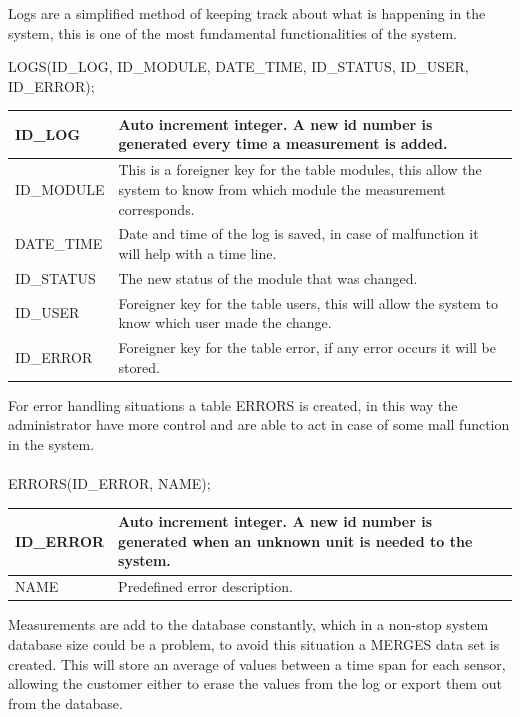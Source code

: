 Logs are a simplified method of keeping track about what is happening in the system, this is one of the most fundamental functionalities of the system.

LOGS(ID\_LOG, ID\_MODULE, DATE\_TIME, ID\_STATUS, ID\_USER, ID\_ERROR);

\begin{table}[H]
\centering
	\begin{tabular}{| p{2.2cm} | p{10cm} |}
		\hline
		ID\_LOG & Auto increment integer. A new id number is generated every time a measurement is added. \\\hline
		ID\_MODULE & This is a foreigner key for the table modules, this allow the system to know from which module the measurement corresponds.\\\hline
		DATE\_TIME & Date and time of the log is saved, in case of malfunction it will help with a time line. \\\hline
		ID\_STATUS & The new status of the module that was changed.\\\hline
		ID\_USER & Foreigner key for the table users, this will allow the system to know which user made the change. \\\hline
		ID\_ERROR & Foreigner key for the table error, if any error occurs it will be stored. \\\hline
	\end{tabular}
\end{table}

For error handling situations a table ERRORS is created, in this way the administrator have more control and are able to act in case of some mall function in the system.
\\\\

ERRORS(ID\_ERROR, NAME);

\begin{table}[H]
\centering
	\begin{tabular}{| p{2cm} | p{10cm} |}
		\hline
		ID\_ERROR & Auto increment integer. A new id number is generated when an unknown unit is needed to the system. \\\hline
		NAME & Predefined error description. \\\hline
	\end{tabular}
\end{table}

Measurements are add to the database constantly, which in a non-stop system database size could be a problem, to avoid this situation a MERGES data set is created. This will store an average of values between a time span for each sensor, allowing the customer either to erase the values from the log or export them out from the database.
\\\\

